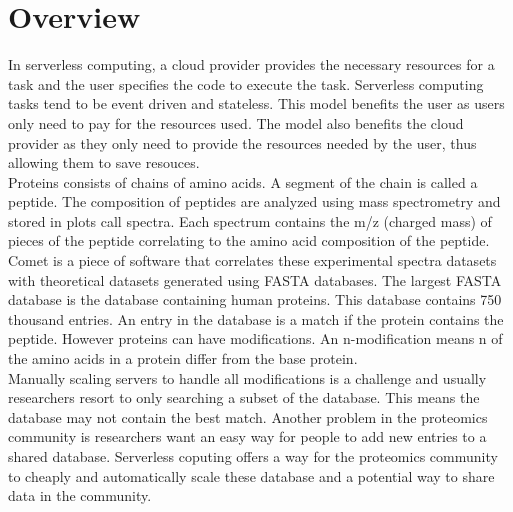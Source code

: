 \newcommand{\LineComment}[1]{\Statex \hfill\textit{#1}}
\vspace{-0.15in}
\section{Overview}
In serverless computing, a cloud provider provides the necessary resources for a task and the user specifies the code to execute the task.
Serverless computing tasks tend to be event driven and stateless.
This model benefits the user as users only need to pay for the resources used.
The model also benefits the cloud provider as they only need to provide the resources needed by the user, thus allowing them to save resouces.\\
\newline
Proteins consists of chains of amino acids.
A segment of the chain is called a peptide.
The composition of peptides are analyzed using mass spectrometry and stored in plots call spectra.
Each spectrum contains the m/z (charged mass) of pieces of the peptide correlating to the amino acid composition of the peptide.
Comet is a piece of software that correlates these experimental spectra datasets with theoretical datasets generated using FASTA databases.
The largest FASTA database is the database containing human proteins.
This database contains 750 thousand entries.
An entry in the database is a match if the protein contains the peptide.
However proteins can have modifications.
An n-modification means n of the amino acids in a protein differ from the base protein.\\
\newline
Manually scaling servers to handle all modifications is a challenge and usually researchers resort to only searching a subset of the database.
This means the database may not contain the best match.
Another problem in the proteomics community is researchers want an easy way for people to add new entries to a shared database.
Serverless coputing offers a way for the proteomics community to cheaply and automatically scale these database and a potential way to share data in the community.
